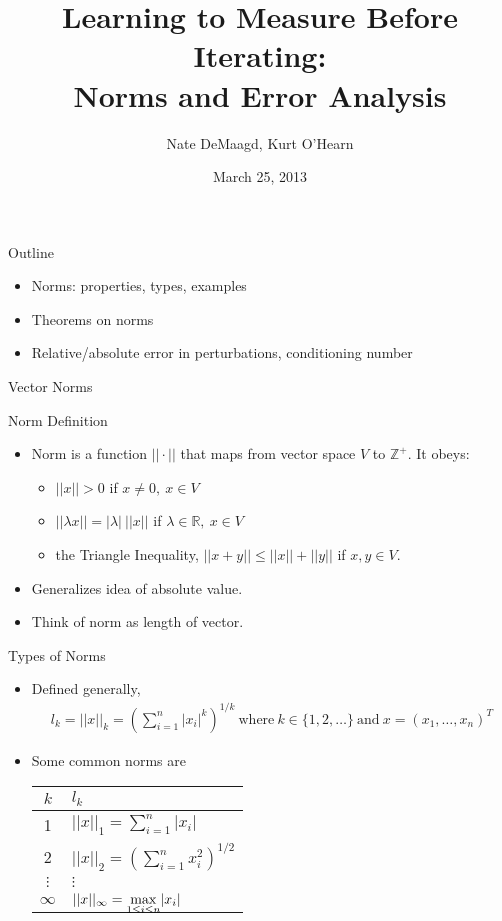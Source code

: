 \documentclass[9pt, serif]{beamer}
\title[Norms and Error Analysis]
{Learning to Measure Before Iterating:\\Norms and Error Analysis}
\author[]
{Nate DeMaagd, Kurt O'Hearn}
\institute[Grand Valley State University]
{MTH 499-02}
\date{March 25, 2013}
\newlength{\wideitemsep}
\let\olditem\item
\renewcommand{\item}{\setlength{\itemsep}{\wideitemsep}\olditem}
\newcommand{\bi}{\begin{itemize}}
\newcommand{\ei}{\end{itemize}}
\begin{document}
\begin{frame}
    \titlepage
\end{frame}

\begin{frame}{Outline}
    \bi
        \item Norms: properties, types, examples \pause
        \item Theorems on norms \pause
        \item Relative/absolute error in perturbations, conditioning number
    \ei
\end{frame}


\begin{frame}{Vector Norms}

Norm Definition
\bi
    \item Norm is a function $||\cdot||$ that maps from vector space $V$ to $\mathbb{Z}^+$. It obeys:
    \pause
    \bi
        \item $||x||>0$ if $x\neq0,~x\in V$
        \pause
        \item $||\lambda x|| = |\lambda|~||x||$ if $\lambda\in\mathbb{R},~x\in V$
        \pause
        \item the Triangle Inequality, $||x+y||\leq||x|| + ||y||$ if $x,y\in V$.
        \pause
    \ei
    \item Generalizes idea of absolute value.
    \pause
    \item Think of norm as length of vector.
\ei
\end{frame}


\begin{frame}{Types of Norms}
\bi

\item Defined generally,
    \begin{align*}
        l_k = ||x||_k = \left(\sum\limits_{i=1}^n |x_i|^k\right)^{1/k}~\text{where}~k\in\{1,2,\dots\}~\text{and}~x=(x_1,\dots,x_n)^T
    \end{align*}
\pause

\item Some common norms are
\begin{table}[H]
        \centering
    \begin{tabular}{c | l}

     $k$ & $l_k$ \\
     \hline
     1 & $||x||_1 = \sum\limits_{i=1}^n |x_i|$ \\
     2 & $||x||_2=\left(\sum\limits_{i=1}^n x_i^2\right)^{1/2}$ \\
    $\vdots$ & $\vdots$ \\
    $\infty$ & $||x||_\infty = \smash{\displaystyle\max_{1 \leq i \leq n}} |x_i|$
    \end{tabular}
    \end{table}

\ei
\end{frame}
\end{document}
